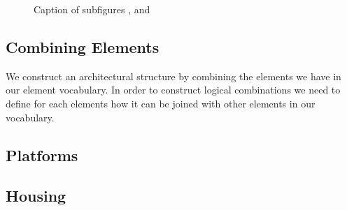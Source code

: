 \begin{figure}[ht]
\centering
{}
\label{fig:archElements}
\caption[Architectural Elements Vocabulary]{Caption of subfigures ,  and }
\end{figure}



\subsection{Combining Elements} 

We construct an architectural structure by combining the elements we have in our element vocabulary.
In order to construct logical combinations we need to define for each elements how it can be joined with other elements
in our vocabulary.
 
\subsection{Platforms}
\label{sec:platform}
 

 

\subsection{Housing}
\label{sec:building}
 


